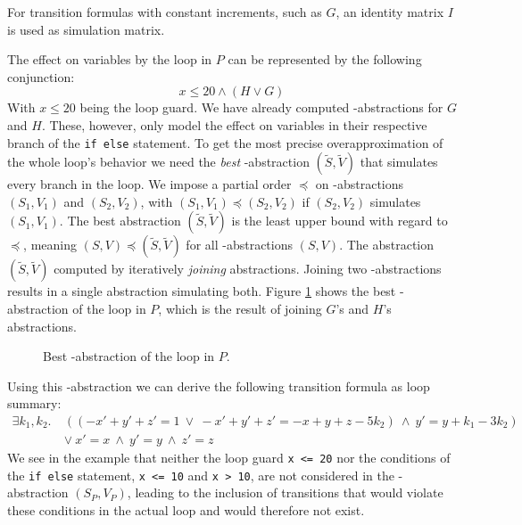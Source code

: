\vspace*{-2em}For transition formulas with constant increments, such as $G$, an identity matrix $I$ is used as simulation matrix. \par
The effect on variables by the loop in $P$ can be represented by the following conjunction: 
\begin{equation*}
	x \leq 20 \land (H \lor G)
\end{equation*}
With $x \leq 20$ being the loop guard. We have already computed \qvasr-abstractions for $G$ and $H$. These, however, only model the effect on variables in their respective branch of the \texttt{if else} statement. To get the most precise overapproximation of the whole loop's behavior we need the \textsl{best} \qvasr-abstraction $(\tilde{S}, \tilde{V})$ that simulates every branch in the loop.
We impose a partial order $\preceq$ on \qvasr-abstractions $(S_1, V_1)$ and $(S_2, V_2)$, with $(S_1, V_1) \preceq (S_2, V_2)$ if $(S_2, V_2)$ simulates $(S_1, V_1)$. The best abstraction $(\tilde{S}, \tilde{V})$ is the least upper bound with regard to $\preceq$, meaning $(S, V) \preceq (\tilde{S}, \tilde{V})$ for all \qvasr-abstractions $(S, V)$. The abstraction $(\tilde{S}, \tilde{V})$ computed by iteratively \textsl{joining} abstractions. Joining two \qvasr-abstractions results in a single abstraction simulating both. Figure \ref{vasr} shows the best \qvasr-abstraction of the loop in $P$, which is the result of joining $G$'s and $H$'s abstractions. \\
\begin{center}
	\begin{figure}[H]
		
		\caption{Best \qvasr-abstraction of the loop in $P$.}
		\label{vasr}
	\end{figure}
\end{center}
Using this \qvasr-abstraction we can derive the following transition formula as loop summary:
\begin{align*}
	\exists k_1, k_2.\ &((-x' + y' + z' = 1\ \lor\ -x' + y' + z' = -x + y + z - 5k_2)\ \land\ y' = y + k_1 - 3k_2)\ \\ &\lor\ x' = x\ \land\ y' = y\ \land\ z' = z
\end{align*}
We see in the example that neither the loop guard \texttt{x <= 20} nor the conditions of the \texttt{if else} statement, \texttt{x <= 10} and \texttt{x > 10}, are not considered in the \qvasr-abstraction $(S_P, V_P)$, leading to the inclusion of transitions that would violate these conditions in the actual loop and would therefore not exist. \\

